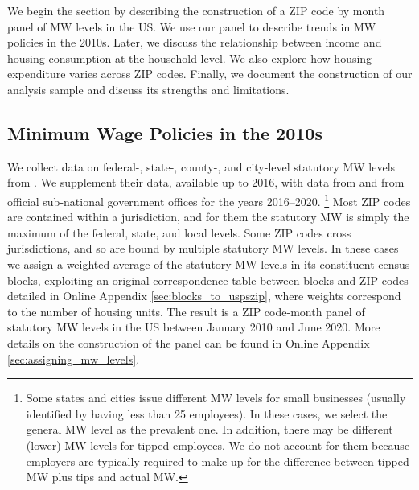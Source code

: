 
We begin the section by describing the construction of a ZIP code by month panel
of MW levels in the US.
We use our panel to describe trends in MW policies in the 2010s.
Later, we discuss the relationship between income and housing consumption at the
household level.
We also explore how housing expenditure varies across ZIP codes.
Finally, we document the construction of our analysis sample and discuss
its strengths and limitations.

\subsection{Minimum Wage Policies in the 2010s}
\label{sec:data_mw_panel}

We collect data on federal-, state-, county-, and city-level statutory MW levels 
from \textcite{VaghulZipperer2016}.
We supplement their data, available up to 2016, with data from 
\textcite{BerkeleyLaborCenter} and from official sub-national government offices 
for the years 2016--2020.%
\footnote{Some states and cities issue different MW levels for small businesses
(usually identified by having less than 25 employees).
In these cases, we select the general MW level as the prevalent one.
In addition, there may be different (lower) MW levels for tipped employees.
We do not account for them because employers are typically required to make up 
for the difference between tipped MW plus tips and actual MW.}
%
%
Most ZIP codes are contained within a jurisdiction, and for them the statutory 
MW is simply the maximum of the federal, state, and local levels.
Some ZIP codes cross jurisdictions, and so are bound by multiple statutory MW 
levels.
In these cases we assign a weighted average of the statutory MW levels in its
constituent census blocks, exploiting an original correspondence table between 
blocks and ZIP codes detailed in Online Appendix \ref{sec:blocks_to_uspszip}, 
where weights correspond to the number of housing units.
The result is a ZIP code-month panel of statutory MW levels in the US between
January 2010 and June 2020.
More details on the construction of the panel can be found in Online Appendix 
\ref{sec:assigning_mw_levels}.

